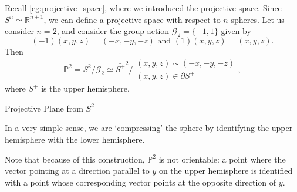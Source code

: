 \documentclass[notoc,notitlepage]{tufte-book}
\begin{document}
\begin{eg}\label{eg:projective_space_p2}
  Recall \cref{eg:projective_space}, where we introduced the projective space.
  Since $S^n \simeq \mathbb{R}^{n + 1}$, we can define a projective space with respect to
  $n$-spheres. Let us consider $n = 2$, and consider the group action $\mathcal{G}_2 = \{ -1
  , 1 \}$ given by
  \begin{equation*}
    (-1)(x, y, z) = (-x, -y, -z) \text{ and } (1)(x, y, z) = (x, y, z).
  \end{equation*}
  Then
  \begin{equation*}
    \mathbb{P}^2 = S^2 / \mathcal{G}_2 \simeq \bar{S^+}^2 / \substack{(x, y, z) \sim (-x, -y, -z) \\ (x, y,
    z) \in \partial S^+},
  \end{equation*}
  where $S^+$ is the upper hemisphere.
  \begin{marginfigure}
    \centering
    \caption{Projective Plane from $S^2$}\label{fig:projective_plane_from_s_2_}
  \end{marginfigure}
  In a very simple sense, we are `compressing' the sphere by identifying the upper
  hemisphere with the lower hemisphere.
  
  Note that because of this construction, $\mathbb{P}^2$ is not orientable: a point where
  the vector pointing at a direction parallel to $y$ on the upper hemisphere is identified
  with a point whose corresponding vector points at the opposite direction of $y$.
\end{eg}
\end{document}
